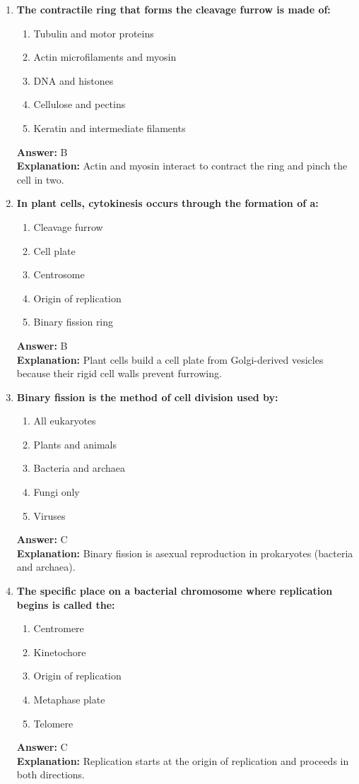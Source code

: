 \documentclass[11pt, a4paper]{article}
\begin{document}
\begin{enumerate}[leftmargin=*, label=\arabic*.]
\item \textbf{The contractile ring that forms the cleavage furrow is made of:}
\begin{enumerate}[label=\Alph*.]
\item Tubulin and motor proteins
\item Actin microfilaments and myosin
\item DNA and histones
\item Cellulose and pectins
\item Keratin and intermediate filaments
\end{enumerate}
\textbf{Answer:} B \\
\textbf{Explanation:} Actin and myosin interact to contract the ring and pinch the cell in two.

\item \textbf{In plant cells, cytokinesis occurs through the formation of a:}
\begin{enumerate}[label=\Alph*.]
\item Cleavage furrow
\item Cell plate
\item Centrosome
\item Origin of replication
\item Binary fission ring
\end{enumerate}
\textbf{Answer:} B \\
\textbf{Explanation:} Plant cells build a cell plate from Golgi-derived vesicles because their rigid cell walls prevent furrowing.

\item \textbf{Binary fission is the method of cell division used by:}
\begin{enumerate}[label=\Alph*.]
\item All eukaryotes
\item Plants and animals
\item Bacteria and archaea
\item Fungi only
\item Viruses
\end{enumerate}
\textbf{Answer:} C \\
\textbf{Explanation:} Binary fission is asexual reproduction in prokaryotes (bacteria and archaea).

\item \textbf{The specific place on a bacterial chromosome where replication begins is called the:}
\begin{enumerate}[label=\Alph*.]
\item Centromere
\item Kinetochore
\item Origin of replication
\item Metaphase plate
\item Telomere
\end{enumerate}
\textbf{Answer:} C \\
\textbf{Explanation:} Replication starts at the origin of replication and proceeds in both directions.


\end{enumerate}
\end{document}
